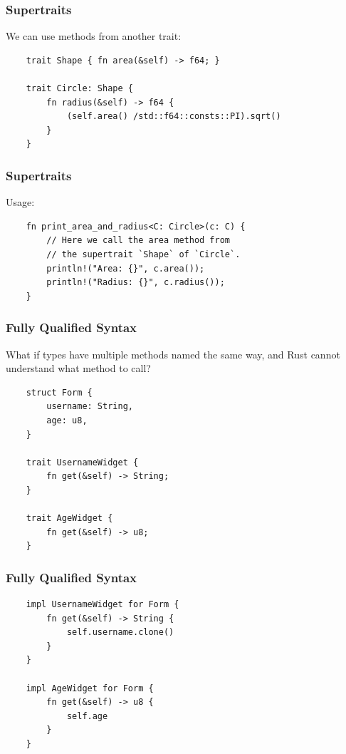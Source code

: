 \documentclass[aspectratio=1610,t]{beamer}
\begin{document}

\begin{frame}[fragile]
\frametitle{Supertraits}
We can use methods from another trait:

\begin{verbatim}
    trait Shape { fn area(&self) -> f64; }

    trait Circle: Shape {
        fn radius(&self) -> f64 {
            (self.area() /std::f64::consts::PI).sqrt()
        }
    }
\end{verbatim}
\end{frame}


\begin{frame}[fragile]
\frametitle{Supertraits}
Usage:

\begin{verbatim}
    fn print_area_and_radius<C: Circle>(c: C) {
        // Here we call the area method from
        // the supertrait `Shape` of `Circle`.
        println!("Area: {}", c.area());
        println!("Radius: {}", c.radius());
    }
\end{verbatim}
\end{frame}


\begin{frame}[fragile]
\frametitle{Fully Qualified Syntax}
What if types have multiple methods named the same way, and Rust cannot understand what method to call?

\begin{verbatim}
    struct Form {
        username: String,
        age: u8,
    }

    trait UsernameWidget {
        fn get(&self) -> String;
    }

    trait AgeWidget {
        fn get(&self) -> u8;
    }
\end{verbatim}
\end{frame}


\begin{frame}[fragile]
\frametitle{Fully Qualified Syntax}
\begin{verbatim}
    impl UsernameWidget for Form {
        fn get(&self) -> String {
            self.username.clone()
        }
    }

    impl AgeWidget for Form {
        fn get(&self) -> u8 {
            self.age
        }
    }
\end{verbatim}
\end{frame}
\end{document}
